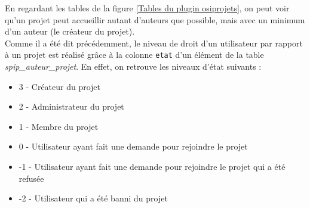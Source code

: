 En regardant les tables de la figure \ref{Tables du plugin osiprojets}, on peut voir qu'un projet peut accueillir autant d'auteurs que possible, mais avec un minimum d'un auteur (le créateur du projet). \\
\newline
Comme il a été dit précédemment, le niveau de droit d'un utilisateur par rapport à un projet est réalisé grâce à la colonne \texttt{etat} d'un élément de la table \textit{spip\_auteur\_projet}. En effet, on retrouve les niveaux d'état suivants : 
\begin{itemize}
    \item 3 - Créateur du projet
    \item 2 - Administrateur du projet
    \item 1 - Membre du projet
    \item 0 - Utilisateur ayant fait une demande pour rejoindre le projet
    \item -1 - Utilisateur ayant fait une demande pour rejoindre le projet qui a été refusée
    \item -2 - Utilisateur qui a été banni du projet
\end{itemize}

